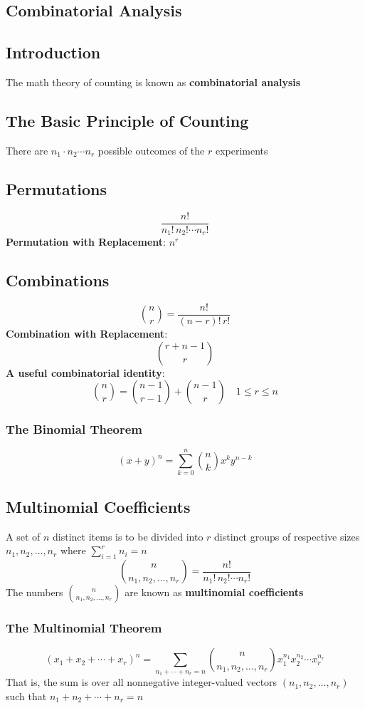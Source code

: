 \documentclass[openany]{book}
\numberwithin{equation}{section}
\begin{document}
\begin{flushleft}
\chapter{Combinatorial Analysis}
\section{Introduction}
The math theory of counting is known as \textbf{combinatorial analysis}	
\section{The Basic Principle of Counting}
There are $n_1 \cdot n_2 \cdots n_r$ possible outcomes of the $r$ experiments
\section{Permutations}
\[ \frac{n!}{n_1! \, n_2! \cdots n_r! }
\]
\textbf{Permutation with Replacement}: $n^r$
\section{Combinations}
\[ {n\choose r}=\frac{n!}{(n-r)! \, r!}
\]
\textbf{Combination with Replacement}:
\[\binom{r+n-1}{r}
\]
\textbf{A useful combinatorial identity}:
\[ {n\choose r}= {n-1 \choose r-1} + {n-1 \choose r} \quad 1\leq r \leq n
\]
\subsection{The Binomial Theorem}	
\[ (x+y)^n=\sum_{k=0}^{n}{n\choose k} x^k y^{n-k}
\]
\section{Multinomial Coefficients}	
A set of $n$ distinct items is to be divided into $r$ distinct groups of respective sizes $n_1,n_2,\dots,n_r$ where $\sum_{i=1}^{r}n_i = n$
\[{n\choose n_1,n_2,\dots,n_r} = \frac{n!}{n_1!\, n_2! \cdots n_r!}
\]
The numbers ${n\choose n_1,n_2,\dots,n_r}$ are known as \textbf{multinomial coefficients}
\subsection{The Multinomial Theorem}
\[(x_1+x_2+\cdots+x_r)^n = \sum_{n_1 + \cdots + n_r =n} {n\choose n_1,n_2,\dots,n_r} x_1^{n_1}x_2^{n_2}\cdots x_r^{n_r}
\]
That is, the sum is over all nonnegative integer-valued vectors $(n_1,n_2,\dots,n_r)$ such that $n_1 + n_2 + \cdots + n_r =n$

\end{flushleft}
\end{document}
